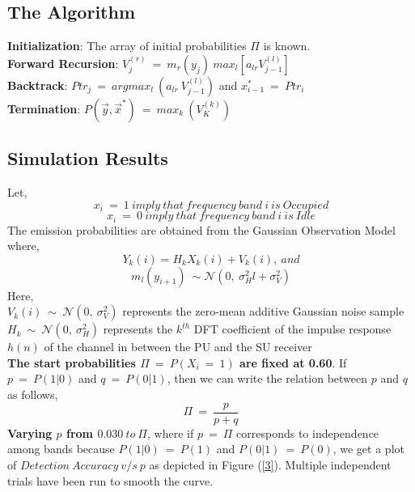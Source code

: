\documentclass[12pt, draftcls, onecolumn]{IEEEtran}
\begin{document}
\subsection{The Algorithm}
\begin{flushleft}
\textbf{Initialization}: The array of initial probabilities $\Pi$ is known.
\\\textbf{Forward Recursion}: $V_j^{(r)}\ =\ m_r(y_j)\ max_{l}[a_{lr}V_{j-1}^{(l)}]$
\\\textbf{Backtrack}: $Ptr_j\ =\ argmax_l\ (a_{lr}\ V_{j-1}^{(l)})$ and $x_{i-1}^*\ =\ Ptr_{i}$
\\\textbf{Termination}: $P(\vec{y},\vec{x}^*)\ =\ max_k\ (V_K^{(k)})$
\end{flushleft}
\subsection{Simulation Results}
Let,
\[x_i\ =\ 1\ imply\ that\ frequency\ band\ i\ is\ Occupied\]
\[x_i\ =\ 0\ imply\ that\ frequency\ band\ i\ is\ Idle\]
The emission probabilities are obtained from the Gaussian Observation Model where,
\[Y_k(i) = H_kX_k(i) + V_k(i),\ and\]
\[m_l(y_{i+1})\ \sim \mathcal{N}(0,\ \sigma_H^2l+\sigma_V^2)\]
Here,
\\$V_k(i)\ \sim\ \mathcal{N}(0,\ \sigma_V^2)$ represents the zero-mean additive Gaussian noise sample
\\$H_k\ \sim\ \mathcal{N}(0,\ \sigma_H^2)$ represents the $k^{th}$ DFT coefficient of the impulse response $h(n)$ of the channel in between the PU and the SU receiver
\\\textbf{The start probabilities $\Pi\ =\ P(X_i\ =\ 1)$ are fixed at 0.60}.
If $p\ =\ P(1|0)$ and $q\ =\ P(0|1)$, then we can write the relation between $p$ and $q$ as follows,
\[\Pi\ =\ \frac{p}{p+q}\]
\textbf{Varying $p$ from $0.030\ to\ \Pi$}, where if $p\ =\ \Pi$ corresponds to independence among bands because $P(1|0)\ =\ P(1)$ and $P(0|1)\ =\ P(0)$, we get a plot of $Detection\ Accuracy\ v/s\ p$ as depicted in Figure (\ref{3}). Multiple independent trials have been run to smooth the curve.
\end{document}
